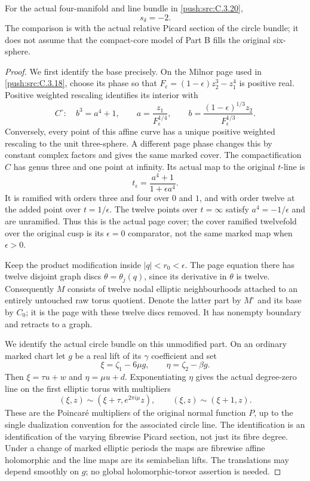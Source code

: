 \begin{proposition}\label{push:src:C.3.21}
For the actual four-manifold and line bundle in \ref{push:src:C.3.20},
\[
 s_\delta=-2.
\]
The comparison is with the actual relative Picard section of
the circle bundle; it does not assume that the compact-core
model of Part B fills the original six-sphere.
\end{proposition}

\begin{proof}
We first identify the base precisely. On the Milnor page used in
\ref{push:src:C.3.18}, choose its phase so that
$F_\epsilon=(1-\epsilon)z_2^3-z_1^4$ is positive real.
Positive weighted rescaling identifies its interior with
\[
 C^\circ:\quad b^3=a^4+1,
 \qquad
 a=\frac{z_1}{F_\epsilon^{1/4}},\qquad
 b=\frac{(1-\epsilon)^{1/3}z_2}{F_\epsilon^{1/3}}.
\]
Conversely, every point of this affine curve has a unique
positive weighted rescaling to the unit three-sphere. A different
page phase changes this by constant complex factors and gives
the same marked cover. The compactification $C$ has genus three
and one point at infinity. Its actual map to the original
$t$-line is
\[
 t_\epsilon=\frac{a^4+1}{1+\epsilon a^4}.
\]
It is ramified with orders three and four over $0$ and $1$,
and with order twelve at the added point over $t=1/\epsilon$.
The twelve points over $t=\infty$ satisfy
$a^4=-1/\epsilon$ and are unramified. Thus this is the
actual page cover; the cover ramified twelvefold over the
original cusp is its $\epsilon=0$ comparator, not the same
marked map when $\epsilon>0$.

Keep the product modification inside $|q|<r_0<\epsilon$.
The page equation there has twelve disjoint graph discs
$\theta=\theta_j(q)$, since its derivative in $\theta$ is
twelve. Consequently $M$ consists of twelve nodal elliptic
neighbourhoods attached to an entirely untouched raw torus
quotient. Denote the latter part by $M^\circ$ and its base by
$C_0$; it is the page with these twelve discs removed. It has
nonempty boundary and retracts to a graph.

We identify the actual circle bundle on this unmodified part.
On an ordinary marked chart let $g$ be a real lift of its
$\gamma$ coefficient and set
\[
 \xi=\zeta_1-6\mu g,\qquad
 \eta=\zeta_2-\beta g.
\]
Then $\xi=\tau u+w$ and $\eta=\mu u+d$. Exponentiating
$\eta$ gives the actual degree-zero line on the first elliptic
torus with multipliers
\[
 (\xi,z)\sim(\xi+\tau,e^{2\pi i\mu}z),\qquad
 (\xi,z)\sim(\xi+1,z).
\]
These are the Poincar\'e multipliers of the original normal
function $P$, up to the single dualization convention for the
associated circle line. The identification is an identification
of the varying fibrewise Picard section, not just its fibre
degree. Under a change of marked elliptic periods the maps are
fibrewise affine holomorphic and the line maps are its
semiabelian lifts. The translations may depend smoothly on
$g$; no global holomorphic-torsor assertion is needed.


\end{proof}
